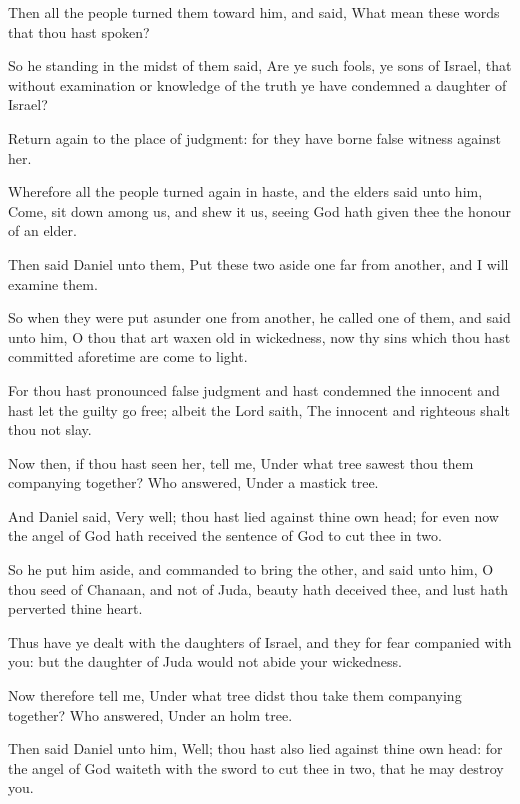 {\par }{\PP {}Then all the people turned them toward him, and said, What mean these words that thou hast spoken?
\par }{\PP {}So he standing in the midst of them said, Are ye such fools, ye sons of Israel, that without examination or knowledge of the truth ye have condemned a daughter of Israel?
\par }{\PP {}Return again to the place of judgment: for they have borne false witness against her.
\par }{\PP {}Wherefore all the people turned again in haste, and the elders said unto him, Come, sit down among us, and shew it us, seeing God hath given thee the honour of an elder.
\par }{\PP {}Then said Daniel unto them, Put these two aside one far from another, and I will examine them.
\par }{\PP {}So when they were put asunder one from another, he called one of them, and said unto him, O thou that art waxen old in wickedness, now thy sins which thou hast committed aforetime are come to light.
\par }{\PP {}For thou hast pronounced false judgment and hast condemned the innocent and hast let the guilty go free; albeit the Lord saith, The innocent and righteous shalt thou not slay.
\par }{\PP {}Now then, if thou hast seen her, tell me, Under what tree sawest thou them companying together? Who answered, Under a mastick tree.
\par }{\PP {}And Daniel said, Very well; thou hast lied against thine own head; for even now the angel of God hath received the sentence of God to cut thee in two.
\par }{\PP {}So he put him aside, and commanded to bring the other, and said unto him, O thou seed of Chanaan, and not of Juda, beauty hath deceived thee, and lust hath perverted thine heart.
\par }{\PP {}Thus have ye dealt with the daughters of Israel, and they for fear companied with you: but the daughter of Juda would not abide your wickedness.
\par }{\PP {}Now therefore tell me, Under what tree didst thou take them companying together? Who answered, Under an holm tree.
\par }{\PP {}Then said Daniel unto him, Well; thou hast also lied against thine own head: for the angel of God waiteth with the sword to cut thee in two, that he may destroy you.
}
